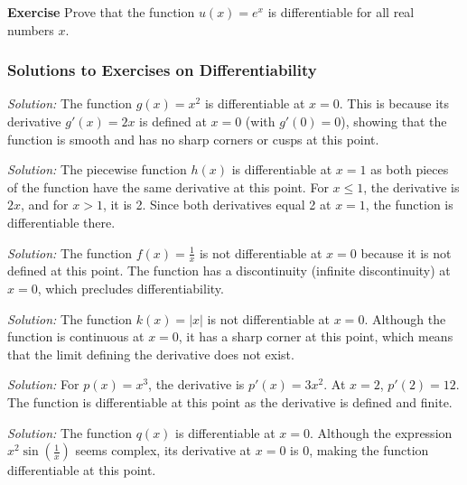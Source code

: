 \documentclass[a4paper,12pt]{book}
\newenvironment{exercise}[1][]
  {\par\medskip\noindent\textbf{Exercise #1} \rmfamily}
  {\medskip}
\newenvironment{solution}[1][]
{\par\noindent\textit{Solution:} \rmfamily}{\medskip}
\begin{document}
\begin{exercise}
Prove that the function \( u(x) = e^x \) is differentiable for all real numbers \( x \).
\end{exercise}

\subsubsection*{Solutions to Exercises on Differentiability}

\begin{solution}[1]
The function \( g(x) = x^2 \) is differentiable at \( x = 0 \). This is because its derivative \( g'(x) = 2x \) is defined at \( x = 0 \) (with \( g'(0) = 0 \)), showing that the function is smooth and has no sharp corners or cusps at this point.
\end{solution}

\begin{solution}[2]
The piecewise function \( h(x) \) is differentiable at \( x = 1 \) as both pieces of the function have the same derivative at this point. For \( x \leq 1 \), the derivative is \( 2x \), and for \( x > 1 \), it is 2. Since both derivatives equal 2 at \( x = 1 \), the function is differentiable there.
\end{solution}

\begin{solution}[3]
The function \( f(x) = \frac{1}{x} \) is not differentiable at \( x = 0 \) because it is not defined at this point. The function has a discontinuity (infinite discontinuity) at \( x = 0 \), which precludes differentiability.
\end{solution}

\begin{solution}[4]
The function \( k(x) = |x| \) is not differentiable at \( x = 0 \). Although the function is continuous at \( x = 0 \), it has a sharp corner at this point, which means that the limit defining the derivative does not exist.
\end{solution}

\begin{solution}[5]
For \( p(x) = x^3 \), the derivative is \( p'(x) = 3x^2 \). At \( x = 2 \), \( p'(2) = 12 \). The function is differentiable at this point as the derivative is defined and finite.
\end{solution}

\begin{solution}[6]
The function \( q(x) \) is differentiable at \( x = 0 \). Although the expression \( x^2 \sin(\frac{1}{x}) \) seems complex, its derivative at \( x = 0 \) is 0, making the function differentiable at this point.
\end{solution}
\end{document}
